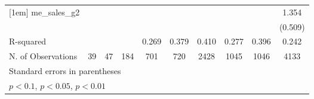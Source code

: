 {\begin{tabular}{l*{9}{c}}
[1em]
me\_sales\_g2 &                     &                     &                     &                     &                     &                     &                     &                     &       1.354\sym{**} \\
            &                     &                     &                     &                     &                     &                     &                     &                     &     (0.509)         \\
\hline
R-squared   &                     &                     &                     &       0.269         &       0.379         &       0.410         &       0.277         &       0.396         &       0.242         \\
N. of Observations &          39         &          47         &         184         &         701         &         720         &        2428         &        1045         &        1046         &        4133         \\
\hline\hline
\multicolumn{10}{l}{\footnotesize Standard errors in parentheses}\\
\multicolumn{10}{l}{\footnotesize \sym{*} \(p<0.1\), \sym{**} \(p<0.05\), \sym{***} \(p<0.01\)}\\
\end{tabular}
}

